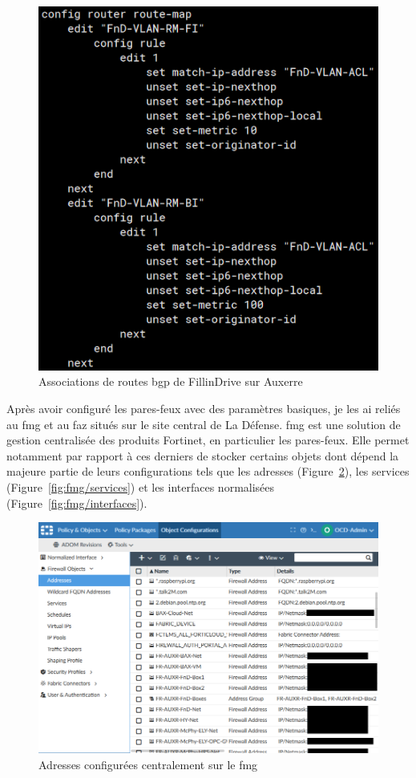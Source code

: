 \documentclass[12pt, oneside, a4paper, titlepage]{report}
\begin{document}
\begin{figure}[h!]
    \centering
    \includegraphics[width = 0.7\linewidth]{img/fgt-auxr/route-maps.png}
    \caption{Associations de routes \gls{bgp} de FillinDrive sur Auxerre}%
    \label{fig:fgt-auxr/route-maps}
\end{figure}
\FloatBarrier{}

Après avoir configuré les pares-feux avec des paramètres basiques, je les ai
reliés au \acrlong{fmg} et au \acrlong{faz} situés sur le site central de La
Défense. \acrfull{fmg} est une solution de gestion centralisée des produits
Fortinet, en particulier les pares-feux. Elle permet notamment par rapport à ces
derniers de stocker certains objets dont dépend la majeure partie de leurs
configurations tels que les adresses (Figure~\ref{fig:fmg/addresses}), les
services (Figure~\ref{fig:fmg/services}) et les interfaces normalisées
(Figure~\ref{fig:fmg/interfaces}).

\begin{figure}[h!]
    \centering
    \includegraphics[width = \linewidth]{img/fmg/addresses.png}
    \caption{Adresses configurées centralement sur le \acrlong{fmg}}%
    \label{fig:fmg/addresses}
\end{figure}
\end{document}
